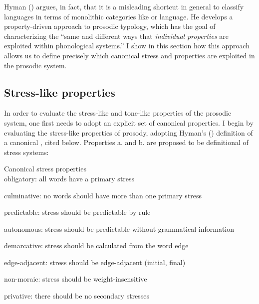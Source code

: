 \documentclass[output=paper
,newtxmath
,modfonts
,nonflat]{langsci/langscibook}
\begin{document}
Hyman (\citeyear{Hyman2009,Hyman2012,Hyman2014}) argues, in fact, that it is a misleading shortcut in general to classify languages in terms of monolithic categories like  or  language. He develops a property-driven approach to prosodic typology, which has the goal of characterizing the “same and different ways that \textit{individual properties} are exploited within phonological systems.” I show in this section how this approach allows us to define precisely which canonical stress and  properties are exploited in the  prosodic system.

\subsection{Stress-like properties}\label{sec:downing:3.1}

In order to evaluate the stress-like and tone-like properties of the  prosodic system, one first needs to adopt an explicit set of canonical properties. I begin by evaluating the stress-like properties of  prosody, adopting Hyman's (\citeyear{Hyman2012,Hyman2014}) definition of a canonical , cited below. Properties a. and b. are proposed to be definitional of stress systems:

\begin{comment}
\ea 
 \gll \\
   \\
 \glt
\z
\end{comment}
\ea\label{ex:downing:7} Canonical stress properties \citep[61]{Hyman2014}\\
\ea\label{ex:downing:7a} obligatory:  all words have a primary stress

\ex\label{ex:downing:7b} culminative: no words should have more than one primary stress

\ex\label{ex:downing:7c} predictable: stress should be predictable by rule

\ex\label{ex:downing:7d} autonomous: stress should be predictable without grammatical information

\ex\label{ex:downing:7e} demarcative: stress should be calculated from the word edge

\ex\label{ex:downing:7f} edge-adjacent: stress should be edge-adjacent (initial, final)

\ex\label{ex:downing:7g} non-moraic: stress should be weight-insensitive

\ex\label{ex:downing:7h} privative: there should be no secondary stresses
\end{document}
